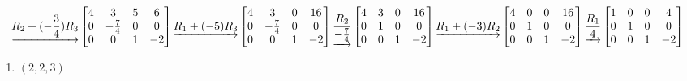 \documentclass[
  11,
]{article}
\providecommand{\tightlist}{%
  \setlength{\itemsep}{0pt}\setlength{\parskip}{0pt}}
\begin{document}
\[\underrightarrow{ R_2 + (- \frac{3}{4})R_3 }
\left[\begin{matrix}4 & 3 & 5 & 6\\0 & - \frac{7}{4} & 0 & 0\\0 & 0 & 1 & -2\end{matrix}\right]
\underrightarrow{ R_1 + (-5)R_3 }
\\
\left[\begin{matrix}4 & 3 & 0 & 16\\0 & - \frac{7}{4} & 0 & 0\\0 & 0 & 1 & -2\end{matrix}\right]
\underrightarrow{ \frac{R_2}{- \frac{7}{4}} }
\left[\begin{matrix}4 & 3 & 0 & 16\\0 & 1 & 0 & 0\\0 & 0 & 1 & -2\end{matrix}\right]
\underrightarrow{ R_1 + (-3)R_2 }
\\
\left[\begin{matrix}4 & 0 & 0 & 16\\0 & 1 & 0 & 0\\0 & 0 & 1 & -2\end{matrix}\right]
\underrightarrow{ \frac{R_1}{4} }
\left[\begin{matrix}1 & 0 & 0 & 4\\0 & 1 & 0 & 0\\0 & 0 & 1 & -2\end{matrix}\right]
  \]

\begin{enumerate}
\def\labelenumi{\alph{enumi})}
\setcounter{enumi}{2}
\tightlist
\item
  \((2,2,3)\)
\end{enumerate}
\end{document}
